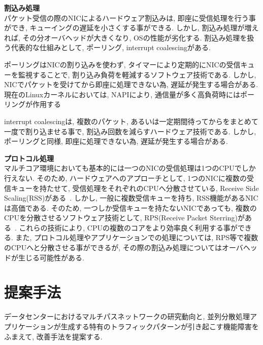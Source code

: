 \documentclass[11pt, a4paper, uplatex]{jsarticle}
\begin{document}
{\bf 割込み処理}\\
パケット受信の際のNICによるハードウェア割込みは, 即座に受信処理を行う事ができ, キューイングの遅延を小さくする事ができる.
しかし, 割込み処理が増えれば, その分オーバヘッドが大きくなり, OSの性能が劣化する.
割込み処理を扱う代表的な仕組みとして, ポーリング, interrupt coalescingがある.

ポーリングはNICの割り込みを使わず, タイマーにより定期的にNICの受信キューを監視することで, 割り込み負荷を軽減するソフトウェア技術である.
しかし, NICでパケットを受けてから即座に処理できない為, 遅延が発生する場合がある.
現在のLinuxカーネルにおいては, NAPIにより, 通信量が多く高負荷時にはポーリングが作用する~\cite{NAPI}

interrupt coalescingは, 複数のパケット, あるいは一定期間待ってからをまとめて一度で割り込ませる事で,
割込み回数を減らすハードウェア技術である.
しかし, ポーリングと同様, 即座に処理できない為, 遅延が発生する場合がある.

{\bf プロトコル処理}\\
マルチコア環境においても基本的には一つのNICの受信処理は1つのCPUでしか行えない.
そのため, ハードウェアへのアプローチとして, 1つのNICに複数の受信キューを持たせて, 受信処理をそれぞれのCPUへ分散させている, Receive
Side Scaling(RSS)がある~\cite{RSS}.
しかし, 一般に複数受信キューを持ち, RSS機能があるNICは高価である\cite{intel}.
そのため, 一つしか受信キューを持たないNICであっても, 複数のCPUを分散させるソフトウェア技術として, RPS(Receive Packet
Sterring)がある~\cite{RPS}.
これらの技術により, CPUの複数のコアをより効率良く利用する事ができる.
また, プロトコル処理やアプリケーションでの処理については, RPS等で複数のCPUへと分散させる事ができるが,
その際の割込み処理についてはオーバヘッドが生じる可能性がある.

\section{提案手法}
データセンターにおけるマルチパスネットワークの研究動向と, 並列分散処理アプリケーションが生成する特有のトラフィックパターンが引き起こす機能障害をふまえて,
改善手法を提案する.
\end{document}
